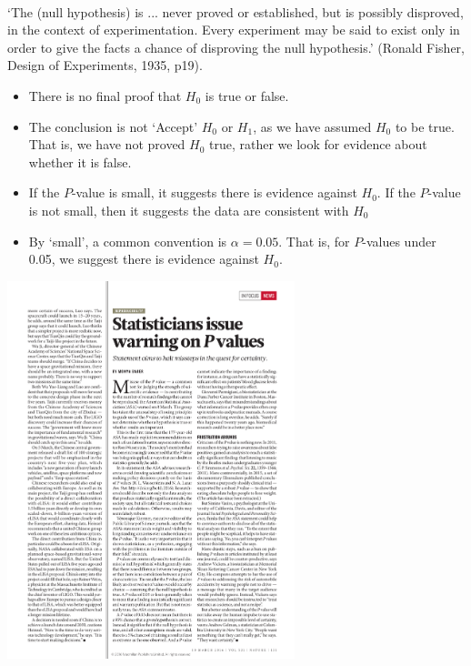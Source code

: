 \documentclass[t,xcolor=pdftex,dvipsnames,table]{beamer}
\begin{document}
\begin{frame}[fragile]{}

 \\

‘The (null hypothesis) is ... never proved or established, but is possibly disproved, in the context of experimentation. Every experiment may be said to exist only in order to give the facts a chance of disproving the null hypothesis.’ (Ronald Fisher, Design of Experiments, 1935, p19).

\begin{itemize}
\item There is no final proof that $H_{0}$ is true or false.

\item The conclusion is not `Accept' $H_{0}$ or $H_{1}$, as  we have assumed $H_{0}$ to be true. 
That is, we have not proved $H_{0}$ true, rather we look for evidence about whether it is false.

\item  If the $P$-value is small, it suggests there is evidence against  $H_{0}$. If the $P$-value is not small, then it suggests the data are consistent with $H_{0}$

\item By `small', a common convention is $\alpha = 0.05$. That is, for $P$-values under 0.05, we suggest there is evidence against  $H_{0}$.
\end{itemize}
\end{frame}

\begin{frame}{}

\begin{center}
\includegraphics[height=11cm]{../images/PvaluesNature2016.pdf}
\end{center}
\end{frame}
\end{document}
